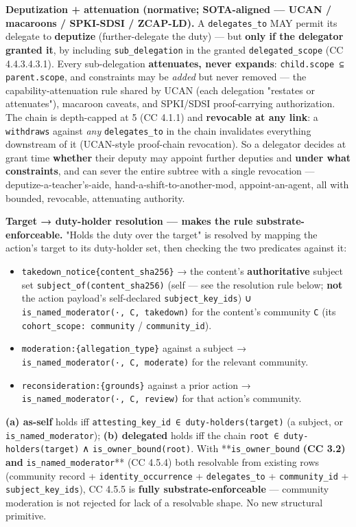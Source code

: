 \documentclass[11pt]{article}
\begin{document}
\textbf{Deputization + attenuation (normative; SOTA-aligned — UCAN / macaroons / SPKI-SDSI / ZCAP-LD).} A \texttt{delegates\_to} MAY permit its delegate to \textbf{deputize} (further-delegate the duty) — but \textbf{only if the delegator granted it}, by including \texttt{sub\_delegation} in the granted \texttt{delegated\_scope} (CC 4.4.3.4.3.1). Every sub-delegation \textbf{attenuates, never expands}: \texttt{child.scope ⊆ parent.scope}, and constraints may be \textit{added} but never removed — the capability-attenuation rule shared by UCAN (each delegation "restates or attenuates"), macaroon caveats, and SPKI/SDSI proof-carrying authorization. The chain is depth-capped at 5 (CC 4.1.1) and \textbf{revocable at any link}: a \texttt{withdraws} against \textit{any} \texttt{delegates\_to} in the chain invalidates everything downstream of it (UCAN-style proof-chain revocation). So a delegator decides at grant time \textbf{whether} their deputy may appoint further deputies and \textbf{under what constraints}, and can sever the entire subtree with a single revocation — deputize-a-teacher's-aide, hand-a-shift-to-another-mod, appoint-an-agent, all with bounded, revocable, attenuating authority.


\textbf{Target → duty-holder resolution — makes the rule substrate-enforceable.} "Holds the duty over the target" is resolved by mapping the action's target to its duty-holder set, then checking the two predicates against it:


\begin{itemize}\setlength\itemsep{0pt}
\item \texttt{takedown\_notice\{content\_sha256\}} → the content's \textbf{authoritative} subject set \texttt{subject\_of(content\_sha256)} (self — see the resolution rule below; \textbf{not} the action payload's self-declared \texttt{subject\_key\_ids}) ∪ \texttt{is\_named\_moderator(·, C, takedown)} for the content's community \texttt{C} (its \texttt{cohort\_scope: community} / \texttt{community\_id}).
\item \texttt{moderation:\{allegation\_type\}} against a subject → \texttt{is\_named\_moderator(·, C, moderate)} for the relevant community.
\item \texttt{reconsideration:\{grounds\}} against a prior action → \texttt{is\_named\_moderator(·, C, review)} for that action's community.
\end{itemize}


\textbf{(a) as-self} holds iff \texttt{attesting\_key\_id ∈ duty-holders(target)} (a subject, or \texttt{is\_named\_moderator}); \textbf{(b) delegated} holds iff the chain \texttt{root ∈ duty-holders(target)} ∧ \texttt{is\_owner\_bound(root)}. With **\texttt{is\_owner\_bound}\textbf{ (CC 3.2) and }\texttt{is\_named\_moderator}** (CC 4.5.4) both resolvable from existing rows (community record + \texttt{identity\_occurrence} + \texttt{delegates\_to} + \texttt{community\_id} + \texttt{subject\_key\_ids}), CC 4.5.5 is \textbf{fully substrate-enforceable} — community moderation is not rejected for lack of a resolvable shape. No new structural primitive.
\end{document}
